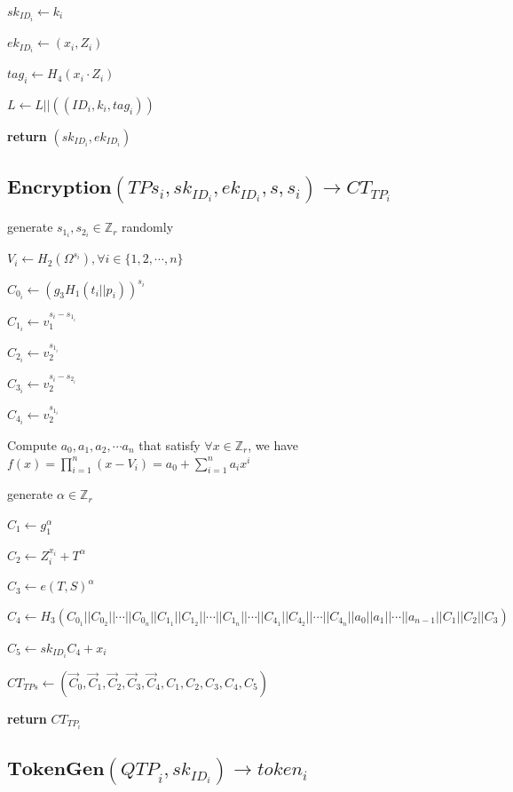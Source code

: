 \documentclass[a4paper]{article}
\begin{document}
$\textit{sk}_{\textit{ID}_i} \gets k_i$

$\textit{ek}_{\textit{ID}_i} \gets (x_i, Z_i)$

$\textit{tag}_i \gets H_4(x_i \cdot Z_i)$

$L \gets L || ((\textit{ID}_i, k_i, \textit{tag}_i))$

\textbf{return} $(\textit{sk}_{\textit{ID}_i}, \textit{ek}_{\textit{ID}_i})$

\subsection{$\textbf{Encryption}(\textit{TPs}_i, \textit{sk}_{\textit{ID}_i}, \textit{ek}_{\textit{ID}_i}, s, s_i) \to \textit{CT}_{\textit{TP}_i}$}

generate $s_{1_i}, s_{2_i} \in \mathbb{Z}_r$ randomly

$V_i \gets H_2(\Omega^{s_i}), \forall i \in \{1, 2, \cdots, n\}$

$C_{0_i} \gets (g_3 H_1(t_i || p_i))^{s_i}$

$C_{1_i} \gets v_1^{s_i - s_{1_i}}$

$C_{2_i} \gets v_2^{s_{1_i}}$

$C_{3_i} \gets v_2^{s_i - s_{2_i}}$

$C_{4_i} \gets v_2^{s_{1_i}}$

Compute $a_0, a_1, a_2, \cdots a_n$ that satisfy $\forall x \in \mathbb{Z}_r$, we have $f(x) = \prod\limits_{i = 1}^n (x - V_i) = a_0 + \sum\limits_{i = 1}^n a_i x^i$

generate $\alpha \in \mathbb{Z}_r$

$C_1 \gets g_1^\alpha$

$C_2 \gets Z_i^{x_i} + T^\alpha$

$C_3 \gets e(T, S)^\alpha$

$C_4 \gets H_3(C_{0_1} || C_{0_2} || \cdots || C_{0_n} || C_{1_1} || C_{1_2} || \cdots || C_{1_n} || \cdots || C_{4_1} || C_{4_2} || \cdots || C_{4_n} || a_0 || a_1 || \cdots || a_{n - 1} || C_1 || C_2 || C_3)$

$C_5 \gets \textit{sk}_{\textit{ID}_i} C_4 + x_i$

$\textit{CT}_{\textit{TPs}} \gets (\vec{C}_0, \vec{C}_1, \vec{C}_2, \vec{C}_3, \vec{C}_4, C_1, C_2, C_3, C_4, C_5)$

\textbf{return} $\textit{CT}_{\textit{TP}_i}$

\subsection{$\textbf{TokenGen}(\textit{QTP}_i, \textit{sk}_{\textit{ID}_i}) \to \textit{token}_i$}
\end{document}
